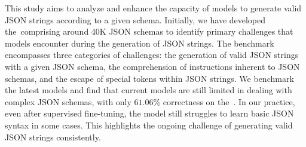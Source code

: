 


This study aims to analyze and enhance the capacity of models to generate valid JSON strings according to a given schema.
Initially, we have developed the~\ourbench comprising around 40K JSON schemas to identify primary challenges that models encounter during the generation of JSON strings.
The benchmark encompasses three categories of challenges: the generation of valid JSON strings with a given JSON schema, the comprehension of instructions inherent to JSON schemas, and the escape of special tokens within JSON strings. 
We benchmark the latest models and find that current models are still limited in dealing with complex JSON schemas, with only $61.06\%$ correctness on the~\ourbench.
In our practice, even after supervised fine-tuning, the model still struggles to learn basic JSON syntax in some cases. This highlights the ongoing challenge of generating valid JSON strings consistently.


